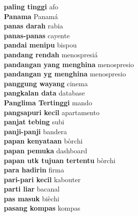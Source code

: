 \textbf{ paling tinggi  } afo \\
\textbf{ Panama  } Panamá \\
\textbf{ panas darah  } rabia \\
\textbf{ panas-panas  } cayente \\
\textbf{ pandai menipu  } bispou \\
\textbf{ pandang rendah  } menospresiá \\
\textbf{ pandangan yang menghina  } menospresio \\
\textbf{ pandangan yg menghina  } menospresio \\
\textbf{ panggung wayang  } cinema \\
\textbf{ pangkalan data  } database \\
\textbf{ Panglima Tertinggi  } mando \\
\textbf{ pangsapuri kecil  } apartamento \\
\textbf{ panjat tebing  } subi \\
\textbf{ panji-panji  } bandera \\
\textbf{ papan kenyataan  } bòrchi \\
\textbf{ papan pemuka  } dashboard \\
\textbf{ papan utk tujuan tertentu  } bòrchi \\
\textbf{ para hadirin  } firma \\
\textbf{ pari-pari kecil  } kabouter \\
\textbf{ parti liar  } bacanal \\
\textbf{ pas masuk  } bièchi \\
\textbf{ pasang kompas  } kompas \\
